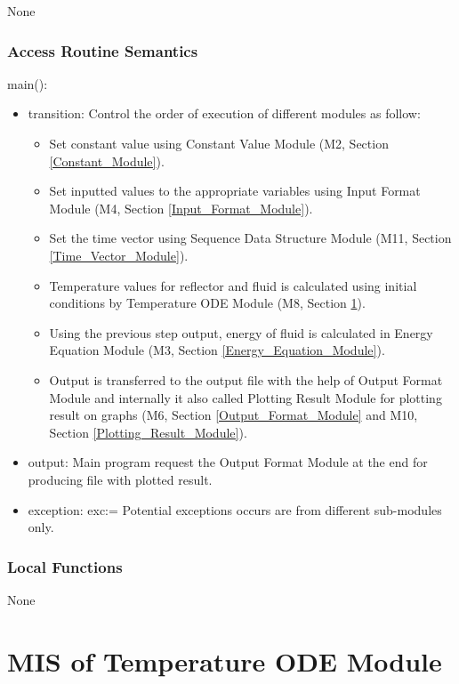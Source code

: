 \documentclass[12pt, titlepage]{article}
\begin{document}
None

\subsubsection{Access Routine Semantics}

\noindent main():
\begin{itemize}
\item transition: Control the order of execution of different modules as follow: \\
\begin{itemize}
    \item Set constant value using Constant Value Module (M2, Section \ref{Constant_Module}). 
    \item Set inputted values to the appropriate variables using Input Format Module (M4, Section \ref{Input_Format_Module}). 
    \item Set the time vector using Sequence Data Structure Module (M11, Section \ref{Time_Vector_Module}).
    \item Temperature values for reflector and fluid is calculated using initial conditions by Temperature ODE Module (M8, Section \ref{Temperature_ODEs_Module}). 
    \item Using the previous step output, energy of fluid is calculated in Energy Equation Module (M3, Section \ref{Energy_Equation_Module}).
    \item Output is transferred to the output file with the help of Output Format Module and internally it also called Plotting Result Module for plotting result on graphs (M6, Section \ref{Output_Format_Module} and M10, Section \ref{Plotting_Result_Module}). 
     
\end{itemize}
\item output: Main program request the Output Format Module at the end for producing file with plotted result. 
\item exception: exc:= Potential exceptions occurs are from different sub-modules only.   
\end{itemize}


\subsubsection{Local Functions}

None


\newpage
\section{MIS of Temperature ODE Module} \label{Temperature_ODEs_Module} 
\end{document}
